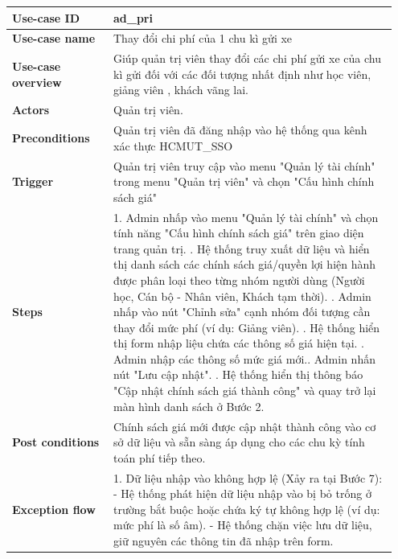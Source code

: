 \begin{table}[htpb]
\centering
\renewcommand{\arraystretch}{1.4}
\begin{tabular}{|p{0.25\linewidth}|p{0.7\linewidth}|}
\hline
\textbf{Use-case ID} & ad\_pri \\ \hline
\textbf{Use-case name} & Thay đổi chi phí của 1 chu kì gửi xe \\ \hline
\textbf{Use-case overview} & Giúp quản trị viên thay đổi các chi phí gửi xe của  chu kì gửi đối với các đối tượng nhất định như học viên, giảng viên , khách vãng lai. \\ \hline
\textbf{Actors} & Quản trị viên. \\ \hline
\textbf{Preconditions} & Quản trị viên đã đăng nhập vào hệ thống qua kênh xác thực HCMUT\_SSO \\ \hline
\textbf{Trigger} & Quản trị viên truy cập vào menu "Quản lý tài chính" trong menu "Quản trị viên" và chọn "Cấu hình chính sách giá" \\ \hline
\textbf{Steps} & 
1. Admin nhấp vào menu "Quản lý tài chính" và chọn tính năng "Cấu hình chính sách giá" trên giao diện trang quản trị. \newline
2. Hệ thống truy xuất dữ liệu và hiển thị danh sách các chính sách giá/quyền lợi hiện hành được phân loại theo từng nhóm người dùng (Người học, Cán bộ - Nhân viên, Khách tạm thời). \newline
3. Admin nhấp vào nút "Chỉnh sửa" cạnh nhóm đối tượng cần thay đổi mức phí (ví dụ: Giảng viên). \newline
4. Hệ thống hiển thị form nhập liệu chứa các thông số giá hiện tại. \newline
5. Admin nhập các thông số mức giá mới.\newline
6. Admin nhấn nút "Lưu cập nhật". \newline
7. Hệ thống hiển thị thông báo "Cập nhật chính sách giá thành công" và quay trở lại màn hình danh sách ở Bước 2.\\ \hline
\textbf{Post conditions} &  Chính sách giá mới được cập nhật thành công vào cơ sở dữ liệu và sẵn sàng áp dụng cho các chu kỳ tính toán phí tiếp theo.\\ \hline
\textbf{Exception flow} & 
1. Dữ liệu nhập vào không hợp lệ (Xảy ra tại Bước 7): \newline
- Hệ thống phát hiện dữ liệu nhập vào bị bỏ trống ở trường bắt buộc hoặc chứa ký tự không hợp lệ (ví dụ: mức phí là số âm). \newline
- Hệ thống chặn việc lưu dữ liệu, giữ nguyên các thông tin đã nhập trên form. \newline

\end{tabular}
\end{table}
